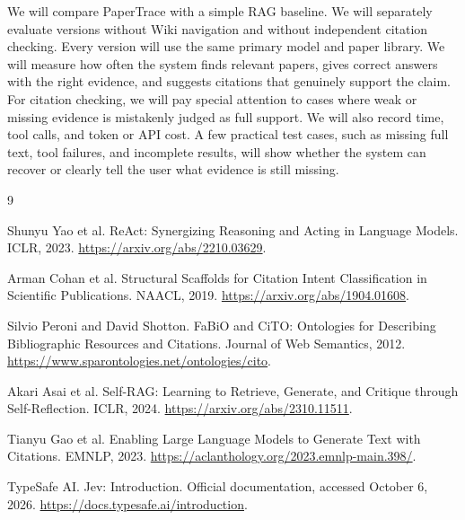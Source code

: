 \documentclass{article}
\begin{document}
We will compare PaperTrace with a simple RAG baseline. We will separately evaluate versions without Wiki navigation and without independent citation checking. Every version will use
the same primary model and paper library. We will measure how often the system finds relevant papers, gives
correct answers with the right evidence, and suggests citations that genuinely support the claim.
For citation checking, we will pay special attention to cases where weak or missing evidence is
mistakenly judged as full support. We will also record time, tool calls, and token or API cost. A
few practical test cases, such as missing full text, tool failures, and incomplete results, will
show whether the system can recover or clearly tell the user what evidence is still missing.

\clearpage
\begin{thebibliography}{9}

Shunyu Yao et al.
\newblock ReAct: Synergizing Reasoning and Acting in Language Models.
\newblock ICLR, 2023. \url{https://arxiv.org/abs/2210.03629}.

Arman Cohan et al.
\newblock Structural Scaffolds for Citation Intent Classification in Scientific Publications.
\newblock NAACL, 2019. \url{https://arxiv.org/abs/1904.01608}.

Silvio Peroni and David Shotton.
\newblock FaBiO and CiTO: Ontologies for Describing Bibliographic Resources and Citations.
\newblock Journal of Web Semantics, 2012. \url{https://www.sparontologies.net/ontologies/cito}.

Akari Asai et al.
\newblock Self-RAG: Learning to Retrieve, Generate, and Critique through Self-Reflection.
\newblock ICLR, 2024. \url{https://arxiv.org/abs/2310.11511}.

Tianyu Gao et al.
\newblock Enabling Large Language Models to Generate Text with Citations.
\newblock EMNLP, 2023. \url{https://aclanthology.org/2023.emnlp-main.398/}.

TypeSafe AI.
\newblock Jev: Introduction. Official documentation, accessed October 6, 2026.
\newblock \url{https://docs.typesafe.ai/introduction}.

\end{thebibliography}
\end{document}

